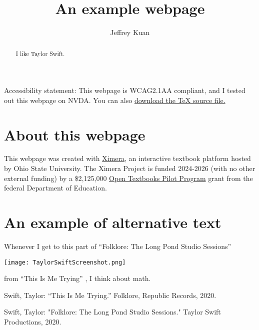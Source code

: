 \documentclass{ximera}
\author{Jeffrey Kuan}
\title{An example webpage}
\begin{document}
\begin{abstract}
   I like Taylor Swift.
\end{abstract}
\maketitle


Accessibility statement: This webpage is WCAG2.1AA compliant, and I tested out this webpage on NVDA. 
You can also \href{https://ximera.osu.edu/firststeps24html/aFirstStepInXimera/basics/MAA_AMS_Example.tex}{download the TeX source file.}

\section{About this webpage}
This webpage was created with \href{https://ximera.osu.edu/}{Ximera}, an 
interactive textbook platform hosted by Ohio State University. The Ximera Project is funded 2024-2026 (with no other external funding) by a 
\$2,125,000 \href{https://www.ed.gov/grants-and-programs/grants-higher-education/improvement-postsecondary-education/open-textbooks-pilot-program}{Open Textbooks Pilot Program} grant from the federal Department of Education.



\section{An example of alternative text}
Whenever I get to this part of ``Folklore: The Long Pond Studio Sessions'' \cite{F:LPSS} 

\texttt{[image: TaylorSwiftScreenshot.png]}

from ``This Is Me Trying'' \cite{TS8}, I think about math. 


\begin{thebibliography}{10}

 Swift, Taylor: “This Is Me Trying.” Folklore, Republic Records, 2020.

 Swift, Taylor: "Folklore: The Long Pond Studio Sessions." Taylor Swift Productions, 2020. 

\end{thebibliography}
\end{document}
